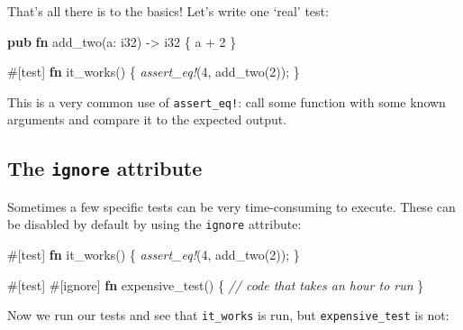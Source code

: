 \documentclass[a4paper,]{book}
\newenvironment{Shaded}{\begin{snugshade}}{\end{snugshade}}
\newcommand{\KeywordTok}[1]{\textcolor[rgb]{0.13,0.29,0.53}{\textbf{{#1}}}}
\newcommand{\DataTypeTok}[1]{\textcolor[rgb]{0.13,0.29,0.53}{{#1}}}
\newcommand{\DecValTok}[1]{\textcolor[rgb]{0.00,0.00,0.81}{{#1}}}
\newcommand{\CommentTok}[1]{\textcolor[rgb]{0.56,0.35,0.01}{\textit{{#1}}}}
\newcommand{\PreprocessorTok}[1]{\textcolor[rgb]{0.56,0.35,0.01}{\textit{{#1}}}}
\newcommand{\AttributeTok}[1]{\textcolor[rgb]{0.77,0.63,0.00}{{#1}}}
\newcommand{\NormalTok}[1]{{#1}}
\begin{document}
That's all there is to the basics! Let's write one `real' test:

\begin{Shaded}
\begin{Highlighting}[]
\KeywordTok{pub} \KeywordTok{fn} \NormalTok{add_two(a: }\DataTypeTok{i32}\NormalTok{) -> }\DataTypeTok{i32} \NormalTok{\{}
    \NormalTok{a + }\DecValTok{2}
\NormalTok{\}}

\AttributeTok{#[}\NormalTok{test}\AttributeTok{]}
\KeywordTok{fn} \NormalTok{it_works() \{}
    \PreprocessorTok{assert_eq!}\NormalTok{(}\DecValTok{4}\NormalTok{, add_two(}\DecValTok{2}\NormalTok{));}
\NormalTok{\}}
\end{Highlighting}
\end{Shaded}

This is a very common use of \texttt{assert\_eq!}: call some function
with some known arguments and compare it to the expected output.

\subsection{\texorpdfstring{The \texttt{ignore}
attribute}{The ignore attribute}}\label{the-ignore-attribute}

Sometimes a few specific tests can be very time-consuming to execute.
These can be disabled by default by using the \texttt{ignore} attribute:

\begin{Shaded}
\begin{Highlighting}[]
\AttributeTok{#[}\NormalTok{test}\AttributeTok{]}
\KeywordTok{fn} \NormalTok{it_works() \{}
    \PreprocessorTok{assert_eq!}\NormalTok{(}\DecValTok{4}\NormalTok{, add_two(}\DecValTok{2}\NormalTok{));}
\NormalTok{\}}

\AttributeTok{#[}\NormalTok{test}\AttributeTok{]}
\AttributeTok{#[}\NormalTok{ignore}\AttributeTok{]}
\KeywordTok{fn} \NormalTok{expensive_test() \{}
    \CommentTok{// code that takes an hour to run}
\NormalTok{\}}
\end{Highlighting}
\end{Shaded}

Now we run our tests and see that \texttt{it\_works} is run, but
\texttt{expensive\_test} is not:
\end{document}
